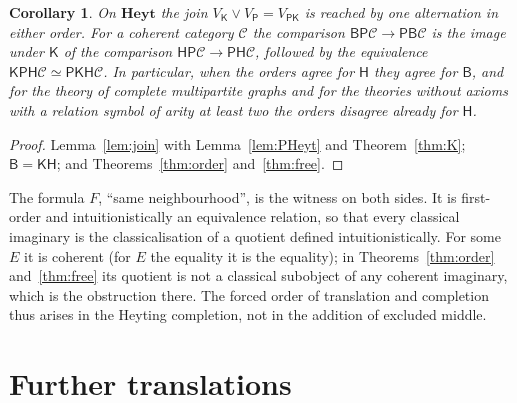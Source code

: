 \documentclass[11pt]{amsart}
\newtheorem{cor}[thm]{Corollary}
\theoremstyle{definition}
\newcommand{\PP}{\mathsf P}
\newcommand{\BB}{\mathsf B}
\newcommand{\cC}{\mathcal C}
\begin{document}
\begin{cor}\label{cor:localise}
On $\mathbf{Heyt}$ the join $V_{\mathsf K}\vee V_\PP=V_{\PP\mathsf K}$ is
reached by one alternation in either order. For a coherent category
$\cC$ the comparison $\BB\PP\cC\to\PP\BB\cC$ is the image under $\mathsf
K$ of the comparison $\mathsf H\PP\cC\to\PP\mathsf H\cC$, followed by the
equivalence $\mathsf K\PP\mathsf H\cC\simeq\PP\mathsf K\mathsf H\cC$. In
particular, when the orders agree for $\mathsf H$ they agree for $\BB$,
and for the theory of complete multipartite graphs and for the theories
without axioms with a relation symbol of arity at least two the orders
disagree already for $\mathsf H$.
\end{cor}
\begin{proof}
Lemma~\ref{lem:join} with Lemma~\ref{lem:PHeyt} and
Theorem~\ref{thm:K}; $\BB=\mathsf K\mathsf H$; and
Theorems~\ref{thm:order} and~\ref{thm:free}.
\end{proof}

The formula $F$, ``same neighbourhood'', is the witness on both sides.
It is first-order and intuitionistically an equivalence relation, so
that every classical imaginary is the classicalisation of a quotient
defined intuitionistically. For some $E$ it is coherent (for $E$ the
equality it is the equality); in Theorems~\ref{thm:order}
and~\ref{thm:free} its quotient is not a classical subobject of any
coherent imaginary, which is the obstruction there. The forced
order of translation and completion thus arises in the Heyting
completion, not in the addition of excluded middle.

\section{Further translations}\label{sec:outlook}
\end{document}
